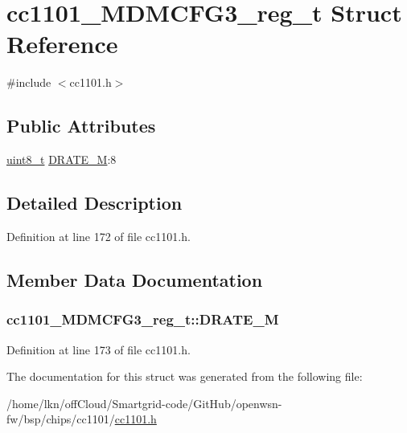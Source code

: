 \hypertarget{structcc1101___m_d_m_c_f_g3__reg__t}{}\section{cc1101\+\_\+\+M\+D\+M\+C\+F\+G3\+\_\+reg\+\_\+t Struct Reference}
\label{structcc1101___m_d_m_c_f_g3__reg__t}


{\ttfamily \#include $<$cc1101.\+h$>$}

\subsection*{Public Attributes}
\begin{DoxyCompactItemize}
\item 
\hyperlink{_p_e___types_8h_aba7bc1797add20fe3efdf37ced1182c5}{uint8\+\_\+t} \hyperlink{structcc1101___m_d_m_c_f_g3__reg__t_a9ff6af63e1c6ff13001294120bbc6d83}{D\+R\+A\+T\+E\+\_\+M}\+:8
\end{DoxyCompactItemize}


\subsection{Detailed Description}


Definition at line 172 of file cc1101.\+h.



\subsection{Member Data Documentation}
\subsubsection[{\texorpdfstring{D\+R\+A\+T\+E\+\_\+M}{DRATE_M}}]{ cc1101\+\_\+\+M\+D\+M\+C\+F\+G3\+\_\+reg\+\_\+t\+::\+D\+R\+A\+T\+E\+\_\+M}\hypertarget{structcc1101___m_d_m_c_f_g3__reg__t_a9ff6af63e1c6ff13001294120bbc6d83}{}\label{structcc1101___m_d_m_c_f_g3__reg__t_a9ff6af63e1c6ff13001294120bbc6d83}


Definition at line 173 of file cc1101.\+h.



The documentation for this struct was generated from the following file\+:\begin{DoxyCompactItemize}
\item 
/home/lkn/off\+Cloud/\+Smartgrid-\/code/\+Git\+Hub/openwsn-\/fw/bsp/chips/cc1101/\hyperlink{cc1101_8h}{cc1101.\+h}\end{DoxyCompactItemize}
